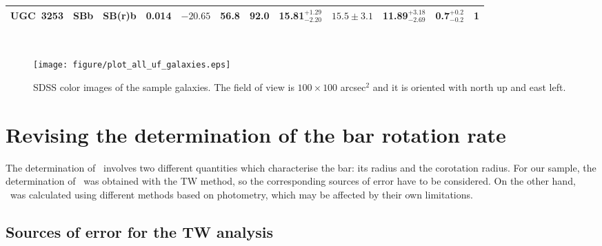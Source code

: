\documentclass{aa}
\begin{document}
\begin{table*}[]
\begin{tabular}{cccccccccccc}
UGC~3253 & SBb & SB(r)b & 0.014 & $-20.65$ & 56.8 & 92.0 & 15.81$^{+1.29}_{-2.20}$ & $15.5\pm3.1$ & 11.89$^{+3.18}_{-2.69}$ & 0.7$^{+0.2}_{-0.2}$ & 1\\
\hline
    \end{tabular}
    \\
    \label{tab:properties}
\end{table*}

\begin{figure*}[!h]
    \centering
    \texttt{[image: figure/plot\_all\_uf\_galaxies.eps]}
    \caption{SDSS color images of the sample galaxies. The field of view is $100\times100$ arcsec$^{2}$ and it is oriented with north up and east left.}
    \label{fig:sample}
\end{figure*}


\section{Revising the determination of the bar rotation rate}
\label{sec:results}

The determination of \rr\ involves two different quantities which characterise the bar: its radius and the corotation radius. For our sample, the determination of \rcor\ was obtained with the TW method, so the corresponding sources of error have to be considered. On the other hand, \rbar\ was calculated using different methods based on photometry, which may be affected by their own limitations. 

\subsection{Sources of error for the TW analysis}
\label{sec:pa_inc}
\end{document}
